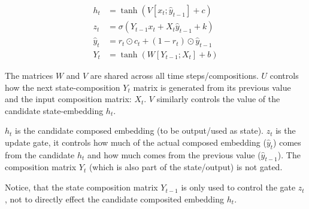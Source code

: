 \documentclass[12pt,parskip]{komatufte}
\begin{document}

 
\begin{align}
h_t &= \tanh\left(V[x_t; \hat{y}_{t-1}] + c \right)\\
z_t &= \sigma\left(Y_{t-1}x_t + X_t \hat{y}_{t-1} + k \right)\\
%
\hat{y}_t &= r_t \odot c_t + (1-r_t) \odot \hat{y}_{t-1} \\
Y_t &= \tanh \left( W[Y_{t-1}; X_t] + b \right)
\end{align}



The matrices $W$ and $V$ are shared across all time steps/compositions.
$U$ controls how the next state-composition $Y_t$ matrix is generated from its previous value and the input composition matrix: $X_t$.
$V$ similarly controls the value of the candidate state-embedding $h_t$.

$h_t$ is the candidate composed embedding (to be output/used as state).
$z_t$ is the update gate, it controls how much of the actual composed embedding ($\hat{y}_t$) comes from the candidate $h_t$ and how much comes from the previous value ($\hat{y}_{t-1}$).
The composition matrix $Y_t$ (which is also part of the state/output) is not gated.

Notice, that the state composition matrix $Y_{t-1}$ is only used to control the gate $z_t$, not to directly effect the candidate composited embedding $h_t$.
\end{document}
